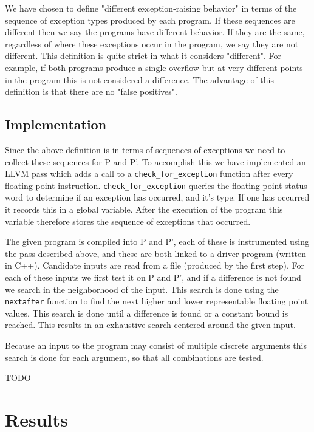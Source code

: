 \documentclass{article}
\begin{document}
We have chosen to define "different exception-raising behavior" in terms of the
sequence of exception types produced by each program. If these sequences are
different then we say the programs have different behavior. If they are the
same, regardless of where these exceptions occur in the program, we say they are
not different. This definition is quite strict in what it considers "different".
For example, if both programs produce a single overflow but at very different
points in the program this is not considered a difference. The advantage of this
definition is that there are no "false positives".

\subsection{Implementation}

Since the above definition is in terms of sequences of exceptions we need to
collect these sequences for P and P'. To accomplish this we have implemented an
LLVM pass which adds a call to a \texttt{check_for_exception} function after
every floating point instruction. \texttt{check_for_exception} queries the
floating point status word \cite{noauthor_status_nodate} to determine if an
exception has occurred, and it's type. If one has occurred it records this in a
global variable. After the execution of the program this variable therefore
stores the sequence of exceptions that occurred.

The given program is compiled into P and P', each of these is instrumented using
the pass described above, and these are both linked to a driver program (written
in C++). Candidate inputs are read from a file (produced by the first step).
For each of these inputs we first test it on P and P', and if a difference is
not found we search in the neighborhood of the input. This search is done using
the \texttt{nextafter} function \cite{noauthor_nextafter3_nodate} to find the
next higher and lower representable floating point values. This search is done
until a difference is found or a constant bound is reached. This results in an
exhaustive search centered around the given input.

Because an input to the program may consist of multiple discrete arguments this
search is done for each argument, so that all combinations are tested.

TODO

\section{Results}
\end{document}
